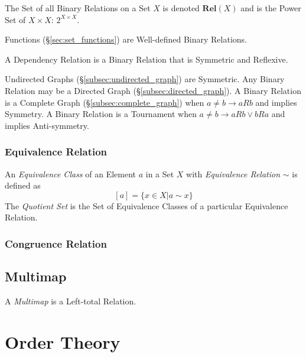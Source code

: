 \documentclass{article}
\begin{document}
The Set of all Binary Relations on a Set $X$ is denoted
$\mathbf{Rel}(X)$ and is the Power Set of $X \times X$: $2^{X \times
  X}$.

Functions (\S\ref{sec:set_functions}) are Well-defined Binary Relations.

A Dependency Relation is a Binary Relation that is Symmetric and
Reflexive.

Undirected Graphs (\S\ref{subsec:undirected_graph}) are Symmetric.
Any Binary Relation may be a Directed Graph
(\S\ref{subsec:directed_graph}). A Binary Relation is a Complete Graph
(\S\ref{subsec:complete_graph}) when $a \neq b \rightarrow aRb$ and
implies Symmetry. A Binary Relation is a Tournament when $a \neq b
\rightarrow aRb \vee bRa$ and implies Anti-symmetry.

\subsubsection{Equivalence Relation}\label{subsec:equivalence_relation}

An \emph{Equivalence Class} of an Element $a$ in a Set $X$ with
\emph{Equivalence Relation} $\sim$ is defined as
\[
    [a] = \{x \in X | a \sim x\}
\]
The \emph{Quotient Set} is the Set of Equivalence Classes of a
particular Equivalence Relation.

\subsubsection{Congruence Relation}\label{subsec:congruence_relation}

\subsection{Multimap}\label{subsec:multimap}

A \emph{Multimap} is a Left-total Relation.

\section{Order Theory}\label{sec:order_theory}
\end{document}
